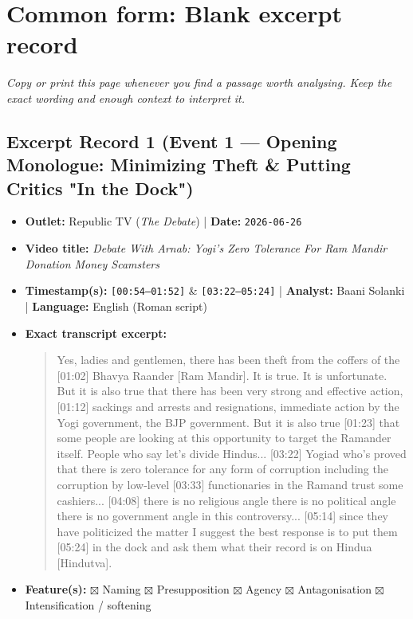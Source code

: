 \documentclass[10pt,a4paper]{article}
\begin{document}
\section*{Common form: Blank excerpt record}
\textit{Copy or print this page whenever you find a passage worth analysing. Keep the exact wording and enough context to interpret it.}


\subsection*{Excerpt Record 1 (Event 1 --- Opening Monologue: Minimizing Theft \& Putting Critics "In the Dock")}
\begin{itemize}[leftmargin=1.5em, itemsep=3pt, topsep=4pt]
  \item \textbf{Outlet:} Republic TV (\textit{The Debate}) | \textbf{Date:} \texttt{2026-06-26}
  \item \textbf{Video title:} \textit{Debate With Arnab: Yogi's Zero Tolerance For Ram Mandir Donation Money Scamsters}
  \item \textbf{Timestamp(s):} \texttt{[00:54--01:52]} \& \texttt{[03:22--05:24]} | \textbf{Analyst:} Baani Solanki | \textbf{Language:} English (Roman script)
  \item \textbf{Exact transcript excerpt:}
    \begin{quote}\small\ttfamily [00:54] Yes, ladies and gentlemen, there has been theft from the coffers of the [01:02] Bhavya Raander [Ram Mandir]. It is true. It is unfortunate. But it is also true that there has been very strong and effective action, [01:12] sackings and arrests and resignations, immediate action by the Yogi government, the BJP government. But it is also true [01:23] that some people are looking at this opportunity to target the Ramander itself. People who say let's divide Hindus... [03:22] Yogiad who's proved that there is zero tolerance for any form of corruption including the corruption by low-level [03:33] functionaries in the Ramand trust some cashiers... [04:08] there is no religious angle there is no political angle there is no government angle in this controversy... [05:14] since they have politicized the matter I suggest the best response is to put them [05:24] in the dock and ask them what their record is on Hindua [Hindutva].\end{quote}
  \item \textbf{Feature(s):} $\boxtimes$ Naming $\boxtimes$ Presupposition $\boxtimes$ Agency $\boxtimes$ Antagonisation $\boxtimes$ Intensification / softening

\end{itemize}
\end{document}
